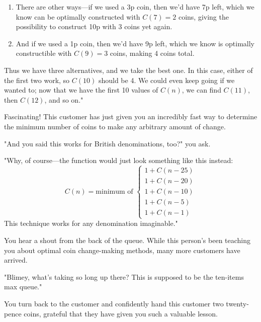 \documentclass{article}
\begin{document}
\begin{multicols}{3}
\begin{enumerate}
    \item There are other ways—if we used a 3p coin, then we'd have 7p left, which we know can be optimally constructed with $C(7) = 2$ coins, giving the possibility to construct 10p with 3 coins yet again.

    \item And if we used a 1p coin, then we'd have 9p left, which we know is optimally constructible with $C(9) = 3$ coins, making 4 coins total.
\end{enumerate}

Thus we have three alternatives, and we take the best one. In this case, either of the first two work, so $C(10)$ should be 4. We could even keep going if we wanted to; now that we have the first 10 values of $C(n)$, we can find $C(11)$, then $C(12)$, and so on."

Fascinating! This customer has just given you an incredibly fast way to determine the minimum number of coins to make any arbitrary amount of change.

"And you said this works for British denominations, too?" you ask.

"Why, of course—the function would just look something like this instead:
\[
C(n) = \text{minimum of }
\begin{cases}
    1 + C(n - 25) \\
    1 + C(n - 20) \\
    1 + C(n - 10) \\
    1 + C(n - 5) \\
    1 + C(n - 1)
\end{cases}
\]
This technique works for any denomination imaginable."


You hear a shout from the back of the queue. While this person's been teaching you about optimal coin change-making methods, many more customers have arrived.

"Blimey, what's taking so long up there? This is supposed to be the ten-items max queue."

You turn back to the customer and confidently hand this customer two twenty-pence coins, grateful that they have given you such a valuable lesson. 

\closearticle


\end{multicols}
\end{document}
